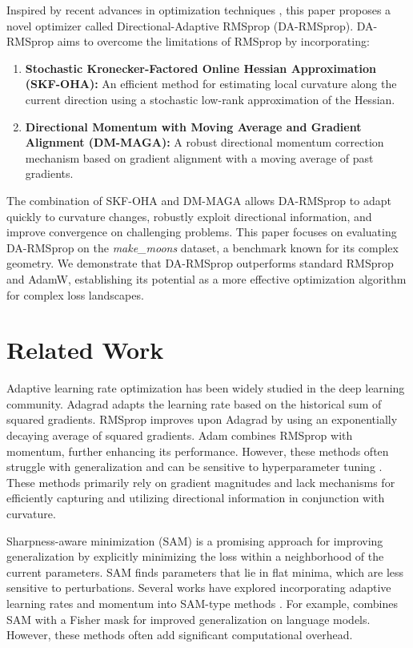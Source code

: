\documentclass[a4paper,11pt]{article}
\begin{document}
Inspired by recent advances in optimization techniques \citep{kleinsorge2023elra, chen2022differentiable, li2023fedhyper}, this paper proposes a novel optimizer called Directional-Adaptive RMSprop (DA-RMSprop). DA-RMSprop aims to overcome the limitations of RMSprop by incorporating:

\begin{enumerate}
    \item \textbf{Stochastic Kronecker-Factored Online Hessian Approximation (SKF-OHA):} An efficient method for estimating local curvature along the current direction using a stochastic low-rank approximation of the Hessian.
    \item \textbf{Directional Momentum with Moving Average and Gradient Alignment (DM-MAGA):} A robust directional momentum correction mechanism based on gradient alignment with a moving average of past gradients.
\end{enumerate}

The combination of SKF-OHA and DM-MAGA allows DA-RMSprop to adapt quickly to curvature changes, robustly exploit directional information, and improve convergence on challenging problems. This paper focuses on evaluating DA-RMSprop on the \textit{make\_moons} dataset, a benchmark known for its complex geometry. We demonstrate that DA-RMSprop outperforms standard RMSprop and AdamW, establishing its potential as a more effective optimization algorithm for complex loss landscapes.

\section{Related Work}

Adaptive learning rate optimization has been widely studied in the deep learning community. Adagrad \citep{duchi2011adaptive} adapts the learning rate based on the historical sum of squared gradients. RMSprop \citep{tieleman2012lecture} improves upon Adagrad by using an exponentially decaying average of squared gradients. Adam \citep{kingma2014adam} combines RMSprop with momentum, further enhancing its performance. However, these methods often struggle with generalization and can be sensitive to hyperparameter tuning \citep{wilson2017marginal}. These methods primarily rely on gradient magnitudes and lack mechanisms for efficiently capturing and utilizing directional information in conjunction with curvature.

Sharpness-aware minimization (SAM) \citep{foret2021sharpness} is a promising approach for improving generalization by explicitly minimizing the loss within a neighborhood of the current parameters. SAM finds parameters that lie in flat minima, which are less sensitive to perturbations. Several works have explored incorporating adaptive learning rates and momentum into SAM-type methods \citep{zhuang2022surrogate, kwon2021asam, mi2023make, zhong2022improving}. For example, \citep{zhong2022improving} combines SAM with a Fisher mask for improved generalization on language models. However, these methods often add significant computational overhead.
\end{document}
